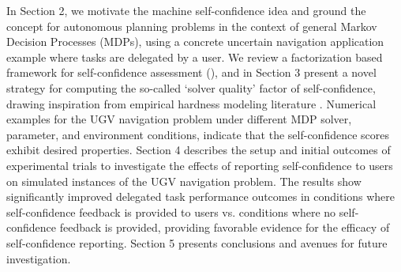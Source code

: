 In Section 2, we motivate the machine self-confidence idea and ground the concept for autonomous planning problems in the context of general Markov Decision Processes (MDPs), using a concrete uncertain navigation application example where tasks are delegated by a user. We review a factorization based framework for self-confidence assessment (\famsec), and in Section 3 present a novel strategy for computing the so-called `solver quality' factor of self-confidence, drawing inspiration from empirical hardness modeling literature \cite{Leyton-Brown2009-yr}. Numerical examples for the UGV navigation problem under different MDP solver, parameter, and environment conditions, indicate that the self-confidence scores exhibit desired properties. Section 4 describes the setup and initial outcomes of experimental trials to investigate the effects of reporting self-confidence to users on simulated instances of the UGV navigation problem. The results show significantly improved delegated task performance outcomes in conditions where self-confidence feedback is provided to users vs. conditions where no self-confidence feedback is provided, providing favorable evidence for the efficacy of self-confidence reporting. Section 5 presents conclusions and avenues for future investigation. %



